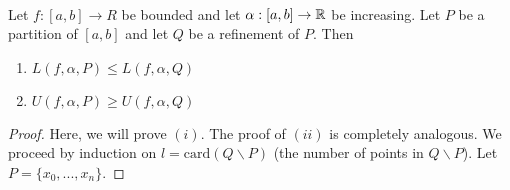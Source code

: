 \begin{theorem} \leavevmode \\
    \label{Thm6.4}
    Let $f:[a,b] \to R$ be bounded and let $\alpha : [a,b] \to \mathbb{R}$ be increasing. Let $P$ be a partition of $[a,b]$ and let $Q$ be a refinement of $P$. Then
    \begin{enumerate}[$(i)$]
        \item $L(f, \alpha, P) \leq L(f, \alpha, Q)$
        \item $U(f, \alpha, P) \geq U(f, \alpha, Q)$
    \end{enumerate}
\end{theorem}
\begin{proof}
    Here, we will prove $(i)$. The proof of $(ii)$ is completely analogous. We proceed by induction on $l = \text{card}(Q \backslash P)$ (the number of points in $Q \backslash P$). Let $P = \{x_0, ..., x_n\}.$


\end{proof}
